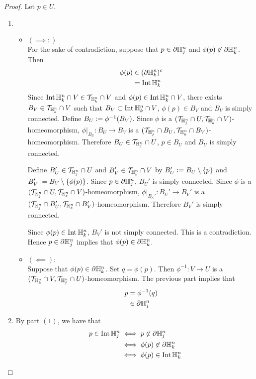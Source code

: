 \documentclass{book}
\begin{document}
	\begin{proof} Let $p \in U$.
		\begin{enumerate}
			\item 
			\begin{itemize}
				\item $(\implies:)$ \\
				For the sake of contradiction, suppose that $p \in \partial \mathbb{H}^n_j$ and $\phi(p) \not \in \partial \mathbb{H}^n_k$. Then 
				\begin{align*}
					\phi(p)
					& \in (\partial \mathbb{H}^n_k)^c \\
					& = \operatorname{Int} \mathbb{H}^n_k
				\end{align*}
				Since $\operatorname{Int} \mathbb{H}^n_k \cap V \in \mathcal{T}_{\mathbb{H}^n_k} \cap V$ and $\phi(p) \in \operatorname{Int} \mathbb{H}^n_k \cap V$, there exists $B_V \in \mathcal{T}_{\mathbb{H}^n_k} \cap V$ such that $B_V \subset \operatorname{Int} \mathbb{H}^n_k \cap V$, $\phi(p) \in B_V$ and $B_V$ is simply connected. Define $B_U \vcentcolon= \phi^{-1}(B_V)$. Since $\phi$ is a $(\mathcal{T}_{\mathbb{H}^n_j} \cap U, \mathcal{T}_{\mathbb{H}^n_k} \cap V)$-homeomorphism, $\phi|_{B_U}: B_U \rightarrow B_V$ is a $(\mathcal{T}_{\mathbb{H}^n_j} \cap B_U, \mathcal{T}_{\mathbb{H}^n_k} \cap B_V)$-homeomorphism. Therefore $B_U \in \mathcal{T}_{\mathbb{H}^n_j} \cap U$, $p \in B_U$ and $B_U$ is simply connected. 
				
				Define $B_U' \in \mathcal{T}_{\mathbb{H}^n_j} \cap U$ and $B_V' \in \mathcal{T}_{\mathbb{H}^n_k} \cap V$ by $B_U' \vcentcolon= B_U \setminus \{p\}$ and $B_V' \vcentcolon= B_V \setminus \{\phi(p)\}$. Since $p \in \partial \mathbb{H}^n_j$, $B_U'$ is simply connected. Since $\phi$ is a $(\mathcal{T}_{\mathbb{H}^n_j} \cap U, \mathcal{T}_{\mathbb{H}^n_k} \cap V)$-homeomorphism, $\phi|_{B_U'}: B_U' \rightarrow B_V'$ is a $(\mathcal{T}_{\mathbb{H}^n_j} \cap B_U', \mathcal{T}_{\mathbb{H}^n_k} \cap B_V')$-homeomorphism. Therefore $B_V'$ is simply connected. 
				
				Since $\phi(p) \in \operatorname{Int} \mathbb{H}^n_k$, $B_V'$ is not simply connected. This is a contradiction. Hence $p \in \partial \mathbb{H}^n_j$ implies that $\phi(p) \in \partial \mathbb{H}^n_k$.
				\item $(\impliedby):$ \\
				Suppose that $\phi(p) \in \partial \mathbb{H}^n_k$. Set $q = \phi(p)$. Then $\phi^{-1}:V \rightarrow U$ is a $(\mathcal{T}_{\mathbb{H}^n_k} \cap V, \mathcal{T}_{\mathbb{H}^n_j} \cap U)$-homeomorphism. The previous part implies that 
				\begin{align*}
					p
					& = \phi^{-1}(q) \\
					& \in \partial \mathbb{H}^n_j
				\end{align*}
			\end{itemize}
			\item By part $(1)$, we have that 
			\begin{align*}
				p \in \operatorname{Int} \mathbb{H}^n_j
				& \iff p \not \in \partial \mathbb{H}^n_j \\
				& \iff \phi(p) \not \in \partial \mathbb{H}^n_k \\ 
				& \iff \phi(p) \in \operatorname{Int} \mathbb{H}^n_k 
			\end{align*}
		\end{enumerate}
	\end{proof}
\end{document}
